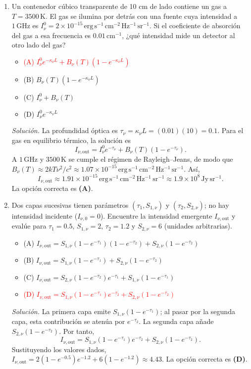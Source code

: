 \documentclass[11pt]{article}
\begin{document}
\begin{enumerate}
    \item Un contenedor cúbico transparente de 10 cm de lado contiene un gas a $T=3500\,\mathrm{K}$. El gas se ilumina por detrás con una fuente cuya intensidad a $1\,\mathrm{GHz}$ es $I^0_\nu=2\times10^{-15}\,\mathrm{erg\,s^{-1}\,cm^{-2}\,Hz^{-1}\,sr^{-1}}$. Si el coeficiente de absorción del gas a esa frecuencia es $0.01\,\mathrm{cm^{-1}}$, ¿qué intensidad mide un detector al otro lado del gas?
    \begin{itemize}
        \item \textcolor{red}{(A) $I^0_\nu e^{-\kappa_\nu L}+B_\nu(T)(1-e^{-\kappa_\nu L})$}
        \item (B) $B_\nu(T)(1-e^{-\kappa_\nu L})$
        \item (C) $I^0_\nu+B_\nu(T)$
        \item (D) $I^0_\nu e^{-\kappa_\nu L}$
    \end{itemize}
    \textit{Solución.} La profundidad óptica es $\tau_\nu=\kappa_\nu L=(0.01)(10)=0.1$. Para el gas en equilibrio térmico, la solución es
    \[
        I_{\nu,\mathrm{out}}=I^0_\nu e^{-\tau_\nu}+B_\nu(T)(1-e^{-\tau_\nu}).
    \]
    A $1\,\mathrm{GHz}$ y $3500\,\mathrm{K}$ se cumple el régimen de Rayleigh--Jeans, de modo que $B_\nu(T)\approx2kT\nu^2/c^2\approx1.07\times10^{-15}\,\mathrm{erg\,s^{-1}\,cm^{-2}\,Hz^{-1}\,sr^{-1}}$. Así,
    \[
        I_{\nu,\mathrm{out}}\approx1.91\times10^{-15}\,\mathrm{erg\,s^{-1}\,cm^{-2}\,Hz^{-1}\,sr^{-1}}
        \approx1.9\times10^8\,\mathrm{Jy\,sr^{-1}}.
    \]
    La opción correcta es \textbf{(A)}. \parencite{chaparro2026}

    \item Dos capas sucesivas tienen parámetros $(\tau_1,S_{1,\nu})$ y $(\tau_2,S_{2,\nu})$; no hay intensidad incidente ($I_{\nu,0}=0$). Encuentre la intensidad emergente $I_{\nu,\mathrm{out}}$ y evalúe para $\tau_1=0.5$, $S_{1,\nu}=2$, $\tau_2=1.2$ y $S_{2,\nu}=6$ (unidades arbitrarias).
    {\small
    \begin{itemize}
        \item (A) $I_{\nu,\mathrm{out}}=S_{1,\nu}(1-e^{-\tau_1})(1-e^{-\tau_2})+S_{2,\nu}(1-e^{-\tau_2})$
        \item (B) $I_{\nu,\mathrm{out}}=S_{1,\nu}(1-e^{-\tau_1})+S_{2,\nu}(1-e^{-\tau_2})$
        \item (C) $I_{\nu,\mathrm{out}}=S_{2,\nu}(1-e^{-\tau_2})e^{-\tau_1}+S_{1,\nu}(1-e^{-\tau_1})$
        \item \textcolor{red}{(D) $I_{\nu,\mathrm{out}}=S_{1,\nu}(1-e^{-\tau_1})e^{-\tau_2}+S_{2,\nu}(1-e^{-\tau_2})$}
    \end{itemize}}
    \textit{Solución.} La primera capa emite $S_{1,\nu}(1-e^{-\tau_1})$; al pasar por la segunda capa, esta contribución se atenúa por $e^{-\tau_2}$. La segunda capa añade $S_{2,\nu}(1-e^{-\tau_2})$. Por tanto,
    \[
        I_{\nu,\mathrm{out}}=S_{1,\nu}(1-e^{-\tau_1})e^{-\tau_2}
        +S_{2,\nu}(1-e^{-\tau_2}).
    \]
    Sustituyendo los valores dados, $I_{\nu,\mathrm{out}}=2(1-e^{-0.5})e^{-1.2}+6(1-e^{-1.2})\approx4.43$. La opción correcta es \textbf{(D)}. \parencite{chaparro2026}
\end{enumerate}
\end{document}

